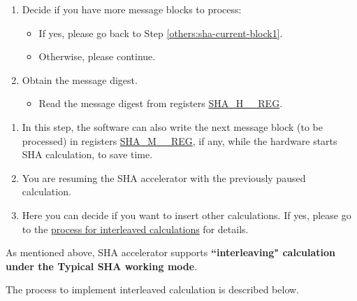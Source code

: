 \documentclass[main\_\_EN.tex]{subfiles}
\begin{document}
\begin{enumerate}
    \item Decide if you have more message blocks to process:
    \begin{itemize}
        \item If yes, please go back to Step \ref{others:sha-current-block1}.
        \item Otherwise, please continue.
    \end{itemize}

    \item Obtain the message digest.
    \begin{itemize}
        \item Read the message digest from registers \hyperref[regdesc:SHAHNREG]{SHA\_H\_\_REG}.
    \end{itemize}
\end{enumerate}

\begin{tiplisting}\label{others:sha-note-typical-sha}
\vspace{-2.5em}
\begin{enumerate}
\item In this step, the software can also write the next message block (to be processed) in registers \hyperref[regdesc:SHAMNREG]{SHA\_M\_\_REG}, if any, while the hardware starts SHA calculation, to save time.
\item You are resuming the SHA accelerator with the previously paused calculation.
\item Here you can decide if you want to insert other calculations. If yes, please go to the \hyperref[others:sha-interleaved]{process for interleaved calculations} for details.
\end{enumerate}
\end{tiplisting}

\label{others:sha-interleaved}As mentioned above, \chipname{} SHA accelerator supports \textbf{``interleaving" calculation under the Typical SHA working mode}.

The process to implement interleaved calculation is described below.
\end{document}
